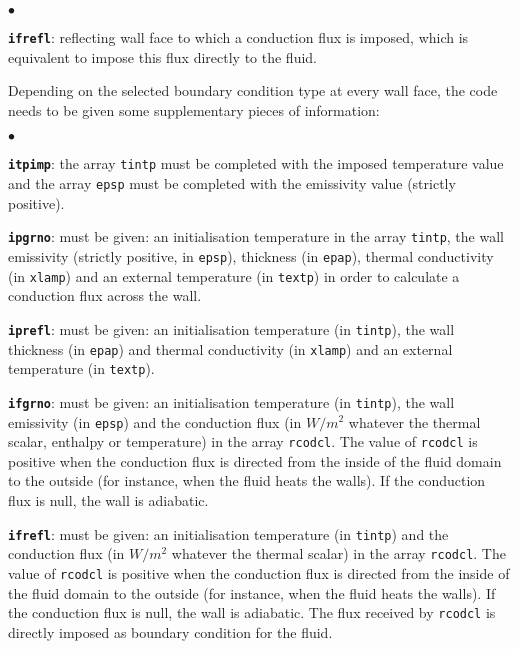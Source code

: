 {{{\begin{list}{$\bullet$}{}
\item \texttt{\textbf{ifrefl}}: reflecting wall face to which a conduction
      flux is imposed, which is equivalent to impose this flux directly
      to the fluid.

\end{list}

\noindent
Depending on the selected boundary condition type at every wall face,
the code needs to be given some supplementary pieces of information:

\begin{list}{$\bullet$}{}

\item \texttt{\textbf{itpimp}}: the array \texttt{tintp} must be completed
      with the imposed temperature value and the array \texttt{epsp} must
      be completed with the emissivity value (strictly positive).

\item \texttt{\textbf{ipgrno}}: must be given: an initialisation temperature in
      the array \texttt{tintp}, the wall emissivity (strictly positive, in
      \texttt{epsp}), thickness (in \texttt{epap}), thermal conductivity
      (in \texttt{xlamp}) and an external temperature (in \texttt{textp})
      in order to calculate a conduction flux across the wall.

\item \texttt{\textbf{iprefl}}: must be given: an initialisation temperature (in
      \texttt{tintp}), the wall thickness (in \texttt{epap}) and thermal conductivity (in
      \texttt{xlamp}) and an external temperature (in \texttt{textp}).

\item \texttt{\textbf{ifgrno}}: must be given: an initialisation temperature (in
      \texttt{tintp}), the wall emissivity (in \texttt{epsp}) and the conduction
      flux (in $W/m^2$ whatever the thermal scalar, enthalpy or temperature) in
      the array \texttt{rcodcl}. The value of \texttt{rcodcl} is positive when the
      conduction flux is directed from the inside of the fluid domain to the
      outside (for instance, when the fluid heats the walls). If the
      conduction flux is null, the wall is adiabatic.

\item \texttt{\textbf{ifrefl}}: must be given: an initialisation temperature (in
      \texttt{tintp}) and the conduction flux (in $W/m^2$ whatever the thermal
      scalar) in the array \texttt{rcodcl}. The value of \texttt{rcodcl} is
      positive when the conduction flux is directed from the inside of the
      fluid domain to the outside (for instance, when the fluid heats the
      walls). If the conduction flux is null, the wall is adiabatic. The flux
      received by \texttt{rcodcl} is directly imposed as boundary condition for
      the fluid.


\end{list}}}}

